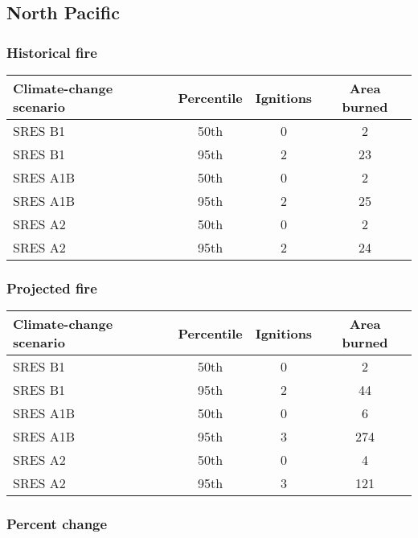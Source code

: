 \documentclass{article}\usepackage[]{graphicx}\usepackage[]{color}
\newcommand{\headcol}{\rowcolor{tableheadcolor}}
\begin{document}
\newpage
\subsection{North Pacific}
\subsubsection{Historical fire}

\begin{table}[ht]
\centering
\begin{tabular}{lccc}
  \headcol 
 \toprule
Climate-change scenario & Percentile & Ignitions & Area burned \\ 
  \midrule
SRES B1 & 50th & 0 & 2 \\ 
  SRES B1 & 95th & 2 & 23 \\ 
  SRES A1B & 50th & 0 & 2 \\ 
  SRES A1B & 95th & 2 & 25 \\ 
  SRES A2 & 50th & 0 & 2 \\ 
  SRES A2 & 95th & 2 & 24 \\ 
   \bottomrule
\end{tabular}
\end{table}


\subsubsection{Projected fire}

\begin{table}[ht]
\centering
\begin{tabular}{lccc}
  \headcol 
 \toprule
Climate-change scenario & Percentile & Ignitions & Area burned \\ 
  \midrule
SRES B1 & 50th & 0 & 2 \\ 
  SRES B1 & 95th & 2 & 44 \\ 
  SRES A1B & 50th & 0 & 6 \\ 
  SRES A1B & 95th & 3 & 274 \\ 
  SRES A2 & 50th & 0 & 4 \\ 
  SRES A2 & 95th & 3 & 121 \\ 
   \bottomrule
\end{tabular}
\end{table}


\subsubsection{Percent change}
\end{document}
